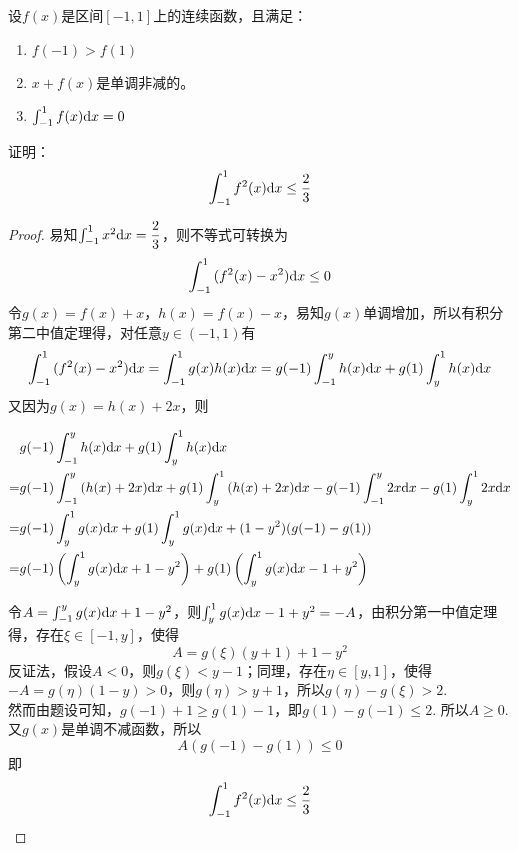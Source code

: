 \begin{proposition}

    设$f(x)$是区间$[-1, 1]$上的连续函数，且满足：

    \begin{enumerate}

        \item $f(-1) > f(1)$
        
        \item $x + f(x)$是单调非减的。
        
        \item $\int_{-1}^{1}{f(x)}\mathrm{d} x = 0$
        
    \end{enumerate}

    证明：
    \[\int_{-1}^{1}{f^2(x)}\mathrm{d} x \leq \dfrac{2}{3}\]
    
\end{proposition}

\begin{proof}

    易知$\int_{-1}^{1}{x^2}\mathrm{d} x = \dfrac{2}{3}$，则不等式可转换为
    \[\int_{-1}^{1}{(f^2(x) - x^2)}\mathrm{d} x \leq 0\]
    令$g(x) = f(x) + x$，$h(x) = f(x) - x$，易知$g(x)$单调增加，所以有积分第二中值定理得，对任意$y \in (-1, 1)$有
    \[\int_{-1}^{1}{(f^2(x) - x^2)}\mathrm{d} x = \int_{-1}^{1}{g(x)h(x)}\mathrm{d} x = g(-1)\int_{-1}^{y}{h(x)}\mathrm{d} x + g(1)\int_{y}^{1}{h(x)}\mathrm{d} x\]
    又因为$g(x) = h(x) + 2x$，则

    \begin{align*}
        & g(-1)\int_{-1}^{y}{h(x)}\mathrm{d} x + g(1)\int_{y}^{1}{h(x)}\mathrm{d} x \\
        = & g(-1)\int_{-1}^{y}{(h(x) + 2x)}\mathrm{d} x + g(1)\int_{y}^{1}{(h(x) + 2x)}\mathrm{d} x - g(-1)\int_{-1}^{y}{2x}\mathrm{d} x - g(1)\int_{y}^{1}{2x}\mathrm{d} x \\
        = & g(-1)\int_{y}^{1}{g(x)}\mathrm{d} x + g(1)\int_{y}^{1}{g(x)}\mathrm{d} x + (1 - y^2)(g(-1) - g(1)) \\
        = & g(-1)\left( \int_{y}^{1}{g(x)}\mathrm{d} x + 1 - y^2 \right) + g(1)\left( \int_{y}^{1}{g(x)}\mathrm{d} x - 1 + y^2 \right)
    \end{align*}

    令$A = \int_{-1}^{y}{g(x)}\mathrm{d} x + 1 - y^2$，则$\int_{y}^{1}{g(x)}\mathrm{d} x - 1 + y^2 = -A$，由积分第一中值定理得，存在$\xi \in [-1, y]$，使得
    \[A = g(\xi)(y + 1) + 1 - y^2\]
    反证法，假设$A < 0$，则$g(\xi) < y - 1$；同理，存在$\eta \in [y, 1]$，使得$-A = g(\eta)(1 - y) > 0$，则$g(\eta) > y + 1$，所以$g(\eta) - g(\xi) > 2$. \\
    然而由题设可知，$g(-1) + 1 \geq g(1) - 1$，即$g(1) - g(-1) \leq 2$. 所以$A \geq 0$. \\
    又$g(x)$是单调不减函数，所以
    \[A(g(-1) - g(1)) \leq 0\]
    即
    \[\int_{-1}^{1}{f^2(x)}\mathrm{d} x \leq \dfrac{2}{3}\]

\end{proof}
